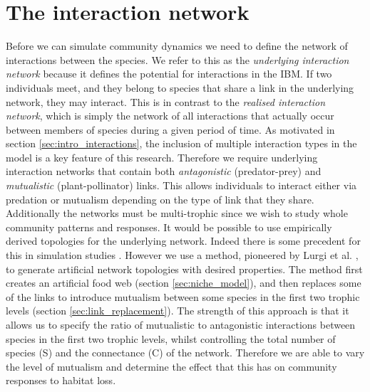 \section{The interaction network}
\label{sec:interaction_network}

Before we can simulate community dynamics we need to define the network of interactions between the species. We refer to this as the \emph{underlying interaction network} because it defines the potential for interactions in the IBM. If two individuals meet, and they belong to species that share a link in the underlying network, they may interact. This is in contrast to the \emph{realised interaction network}, which is simply the network of all interactions that actually occur between members of species during a given period of time. As motivated in section \ref{sec:intro_interactions}, the inclusion of multiple interaction types in the model is a key feature of this research. Therefore we require underlying interaction networks that contain both \emph{antagonistic} (predator-prey) and \emph{mutualistic} (plant-pollinator) links. This allows individuals to interact either via predation or mutualism depending on the type of link that they share. Additionally the networks must be multi-trophic since we wish to study whole community patterns and responses. It would be possible to use empirically derived topologies for the underlying network. Indeed there is some precedent for this in simulation studies \cite{fortuna2013habitat}. However we use a method, pioneered by Lurgi et al. \cite{lurgi2015effects}, to generate artificial network topologies with desired properties. The method first creates an artificial food web (section \ref{sec:niche_model}), and then replaces some of the links to introduce mutualism between some species in the first two trophic levels (section \ref{sec:link_replacement}). The strength of this approach is that it allows us to specify the ratio of mutualistic to antagonistic interactions between species in the first two trophic levels, whilst controlling the total number of species (S) and the connectance (C) of the network. Therefore we are able to vary the level of mutualism and determine the effect that this has on community responses to habitat loss. 

